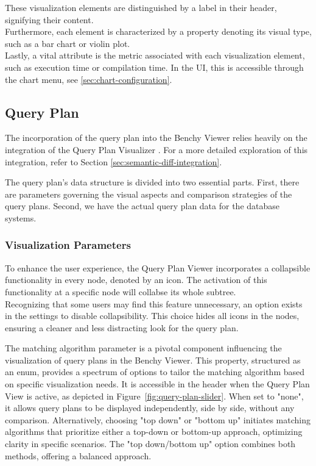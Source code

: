 These visualization elements are distinguished by a label in their header, signifying their content.\\
Furthermore, each element is characterized by a property denoting its visual type, such as a bar chart or violin plot.\\
Lastly, a vital attribute is the metric associated with each visualization element, such as execution time or compilation time. In the UI, this is accessible through the chart menu, see \ref{sec:chart-configuration}.





\subsection{Query Plan}
The incorporation of the query plan into the Benchy Viewer relies heavily on the integration of the Query Plan Visualizer \parencite{semantic-diff}. For a more detailed exploration of this integration, refer to Section \ref{sec:semantic-diff-integration}.

The query plan's data structure is divided into two essential parts. First, there are parameters governing the visual aspects and comparison strategies of the query plans. Second, we have the actual query plan data for the database systems.

\subsubsection{Visualization Parameters}\label{sec:query-plan-parameters}

To enhance the user experience, the Query Plan Viewer incorporates a collapsible functionality in every node, denoted by an icon. The activation of this functionality at a specific node will collabse its whole subtree.\\
Recognizing that some users may find this feature unnecessary, an option exists in the settings to disable collapsibility. This choice hides all icons in the nodes, ensuring a cleaner and less distracting look for the query plan.

The matching algorithm parameter is a pivotal component influencing the visualization of query plans in the Benchy Viewer. This property, structured as an enum, provides a spectrum of options to tailor the matching algorithm based on specific visualization needs. It is accessible in the header when the Query Plan View is active, as depicted in Figure~\ref{fig:query-plan-slider}. When set to "none", it allows query plans to be displayed independently, side by side, without any comparison. Alternatively, choosing "top down" or "bottom up" initiates matching algorithms that prioritize either a top-down or bottom-up approach, optimizing clarity in specific scenarios. The "top down/bottom up" option combines both methods, offering a balanced approach.

